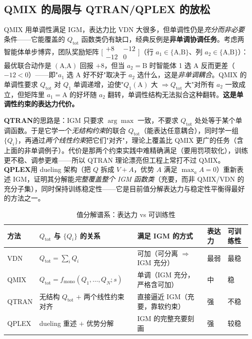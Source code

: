 \subsection{QMIX 的局限与 QTRAN/QPLEX 的放松}

QMIX 用单调性满足 IGM，表达力比 VDN 大很多，但单调性仍是\emph{充分而非必要}条件——它能覆盖的 $Q_{\text{tot}}$ 函数类仍有缺口，经典反例是\textbf{非单调协调任务}。考虑两智能体单步博弈，团队奖励矩阵 $\big[\begin{smallmatrix}+8&-12\\-12&0\end{smallmatrix}\big]$（行 $a_1\in\{\text{A,B}\}$、列 $a_2\in\{\text{A,B}\}$）：最优联合动作是 $(\text{A,A})$ 回报 $+8$，但当 $a_2=\text{B}$ 时智能体 1 选 A 反而更差（$-12<0$）——即"$a_1$ 选 A 好不好"取决于 $a_2$ 选什么，这是\emph{非单调耦合}。QMIX 的单调性要求 $Q_{\text{tot}}$ 对 $Q_1$ 单调递增，迫使"$Q_1(\text{A})$ 大 $\Rightarrow Q_{\text{tot}}$ 大"对所有 $a_2$ 一致成立，但矩阵里 $a_1=\text{A}$ 的好坏随 $a_2$ 翻转，单调性结构无法拟合这种翻转。\textbf{这是单调性约束的表达力代价。}

\textbf{QTRAN}\cite{son2019qtran}的思路是：IGM 只要求 $\arg\max$ 一致，不要求 $Q_{\text{tot}}$ 处处等于某个单调函数。于是它学一个\emph{无结构约束}的联合 $Q_{\text{tot}}$（能表达任意耦合），同时学一组 $\{Q_i\}$，再通过\emph{两个线性约束}把它们"对齐"，理论上覆盖比 QMIX 更广的任务（含上面的非单调例子）。代价是那两个约束实践中难精确满足（要用罚项软化），训练更不稳、调参更难——所以 QTRAN 理论漂亮但工程上常打不过 QMIX。\textbf{QPLEX}\cite{wang2021qplex}用 dueling 架构（把 $Q$ 拆成 $V+A$，优势 $A$ 满足 $\max_a A=0$）重新表述 IGM，证明其分解能\emph{完整覆盖整个 IGM 函数类}（充要，而非 QMIX/VDN 的充分子集），同时保持训练稳定性——它是目前值分解表达力与稳定性平衡得最好的方法之一。

\begin{table}[H]\centering\small
\caption{值分解谱系：表达力 vs 可训练性}
\label{tab:sm-valuedecomp}
\begin{tabular}{p{} p{} p{} p{} p{}}
\toprule
方法 & $Q_{\text{tot}}$ 与 $\{Q_i\}$ 的关系 & 满足 IGM 的方式 & 表达力 & 可训练性 \\
\midrule
VDN & $Q_{\text{tot}}=\sum_i Q_i$ & 可加（可分离 $\Rightarrow$ IGM 充分） & 最弱 & 最稳 \\
QMIX & $Q_{\text{tot}}=f_{\text{mono}}(Q_1,\dots,Q_N;s)$ & 单调（IGM 充分，严格含可加） & 中 & 稳 \\
QTRAN & 无结构 $Q_{\text{tot}}$ $+$ 两个线性约束对齐 & 直接逼近 IGM（充要，靠软约束） & 强 & 不稳 \\
QPLEX & dueling 重述 $+$ 优势分解 & IGM 的完整充要刻画 & 强 & 较稳 \\
\bottomrule
\end{tabular}
\end{table}

